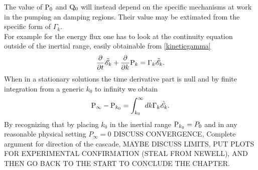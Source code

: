 The value of $\mathrm{P}_0$ and $\mathrm{Q}_0$ will instead depend on the specific mechanisms at work in the pumping an damping regions. Their value may be extimated 
from the specific form of $\Gamma_k$. \\
For example for the energy flux one has to look at the continuity equation outside of the inertial range, easily obtainable from \eqref{kineticgamma} 
\begin{equation}
    \frac{\partial}{\partial t} \tilde{\mathscr{E}}_k + \frac{\partial}{\partial k}  \mathrm{P}_k = \Gamma_k \tilde{\mathscr{E}}_k. 
\end{equation}
When in a stationary solutions the time derivative part is null and by finite integration from a generic $k_0$ to infinity we obtain
\begin{equation}
\mathrm{P}_{\infty} - \mathrm{P}_{k_0} = \int_{k_0}^{\infty} dk \Gamma_k \tilde{\mathscr{E}}_k.
\end{equation}
By recognizing that by placing $k_0$ in the inertial range $\mathrm{P}_{k_0} = P_0$ and in any reasonable physical setting $P_{\infty} = 0$
 DISCUSS CONVERGENCE, Complete argument for direction of the cascade, MAYBE DISCUSS LIMITS, PUT PLOTS FOR EXPERIMENTAL CONFIRMATION (STEAL FROM NEWELL), 
AND THEN GO BACK TO THE START TO CONCLUDE THE CHAPTER. 
  
